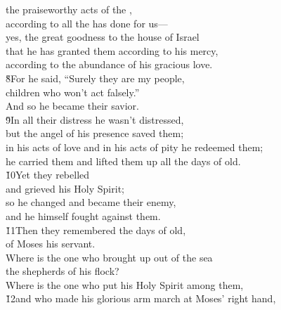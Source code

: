 \begin{poetry}
\poemll    the praiseworthy acts of the , \\
\poeml according to all the  has done for us--- \\
\poemll    yes, the great goodness to the house of Israel \\
\poeml that he has granted them according to his mercy, \\
\poemll    according to the abundance of his gracious love. \\
\poeml \v{8}For he said, ``Surely they are my people, \\
\poemll    children who won't act falsely.'' \\
\poemlll       And so he became their savior. \\
\poeml \v{9}In all their distress he wasn't distressed, \\
\poemll    but the angel of his presence saved them; \\
\poeml in his acts of love and in his acts of pity he redeemed them; \\
\poemll    he carried them and lifted them up all the days of old. \\
\poeml \v{10}Yet they rebelled \\
\poemll    and grieved his Holy Spirit; \\
\poeml so he changed and became their enemy, \\
\poemll    and he himself fought against them. \\
\poeml \v{11}Then they remembered the days of old, \\
\poemll    of Moses his servant. \\
\poeml Where is the one who brought up out of the sea \\
\poemll    the shepherds of his flock? \\
\poeml Where is the one who put his Holy Spirit among them, \\
\poeml \v{12}and who made his glorious arm march at Moses' right hand, \\

\end{poetry}
